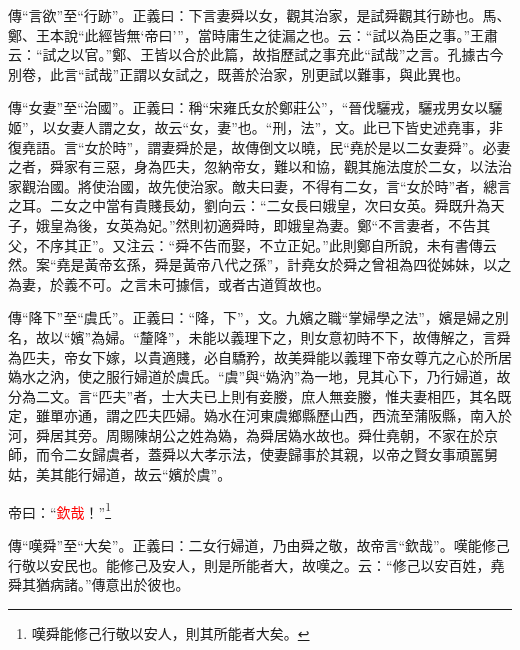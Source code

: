 {\noindent\zhuan{}\fzbyks 傳“言欲”至“行跡”。正義曰：下言妻舜以女，觀其治家，是試舜觀其行跡也。馬、鄭、王本說“此經皆無‘帝曰’”，當時庸生之徒漏之也。云：“試以為臣之事。”王肅云：“試之以官。”鄭、王皆以合於此篇，故指歷試之事充此“試哉”之言。孔據古今別卷，此言“試哉”正謂以女試之，既善於治家，別更試以難事，與此異也。 \par}

{\noindent\zhuan{}\fzbyks 傳“女妻”至“治國”。正義曰：稱“宋雍氏女於鄭莊公”，“晉伐驪戎，驪戎男女以驪姬”，以女妻人謂之女，故云“女，妻”也。“刑，法”，文。此已下皆史述堯事，非復堯語。言“女於時”，謂妻舜於是，故傳倒文以曉，民“堯於是以二女妻舜”。必妻之者，舜家有三惡，身為匹夫，忽納帝女，難以和協，觀其施法度於二女，以法治家觀治國。將使治國，故先使治家。敵夫曰妻，不得有二女，言“女於時”者，總言之耳。二女之中當有貴賤長幼，劉向云：“二女長曰娥皇，次曰女英。舜既升為天子，娥皇為後，女英為妃。”然則初適舜時，即娥皇為妻。鄭“不言妻者，不告其父，不序其正”。又注云：“舜不告而娶，不立正妃。”此則鄭自所說，未有書傳云然。案“堯是黃帝玄孫，舜是黃帝八代之孫”，計堯女於舜之曾祖為四從姊妹，以之為妻，於義不可。之言未可據信，或者古道質故也。 \par}

{\noindent\zhuan{}\fzbyks 傳“降下”至“虞氏”。正義曰：“降，下”，文。九嬪之職“掌婦學之法”，嬪是婦之別名，故以“嬪”為婦。“釐降”，未能以義理下之，則女意初時不下，故傳解之，言舜為匹夫，帝女下嫁，以貴適賤，必自驕矜，故美舜能以義理下帝女尊亢之心於所居媯水之汭，使之服行婦道於虞氏。“虞”與“媯汭”為一地，見其心下，乃行婦道，故分為二文。言“匹夫”者，士大夫已上則有妾媵，庶人無妾媵，惟夫妻相匹，其名既定，雖單亦通，謂之匹夫匹婦。媯水在河東虞鄉縣歷山西，西流至蒲阪縣，南入於河，舜居其旁。周賜陳胡公之姓為媯，為舜居媯水故也。舜仕堯朝，不家在於京師，而令二女歸虞者，蓋舜以大孝示法，使妻歸事於其親，以帝之賢女事頑嚚舅姑，美其能行婦道，故云“嬪於虞”。 \par}

帝曰：“\textcolor{red}{欽哉}！”\footnote{嘆舜能修己行敬以安人，則其所能者大矣。}

{\noindent\zhuan{}\fzbyks 傳“嘆舜”至“大矣”。正義曰：二女行婦道，乃由舜之敬，故帝言“欽哉”。嘆能修己行敬以安民也。能修己及安人，則是所能者大，故嘆之。云：“修己以安百姓，堯舜其猶病諸。”傳意出於彼也。 \par}

